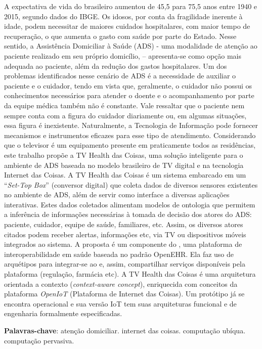 \setlength{\absparsep}{18pt} %
\begin{resumo}

A expectativa de vida do brasileiro aumentou de 45,5 para 75,5 anos entre 1940 e
2015, segundo dados do IBGE. Os idosos, por conta da fragilidade inerente à
idade, podem necessitar de maiores cuidados hospitalares, com maior tempo de
recuperação, o que aumenta o gasto com saúde por parte do Estado. Nesse sentido,
a Assistência Domiciliar à Saúde (ADS) - uma modalidade de atenção ao paciente
realizado em seu próprio domicílio, – apresenta-se como opção mais adequada ao
paciente, além da redução dos gastos hospitalares. Um dos problemas
identificados nesse cenário de ADS é a necessidade de auxiliar o paciente e o
cuidador, tendo em vista que, geralmente, o cuidador não possui os conhecimentos
necessários para atender o doente e o acompanhamento por parte da equipe médica
também não é  constante. Vale ressaltar que o paciente nem sempre conta com a
figura do cuidador diariamente ou, em algumas situações, essa figura é
inexistente. Naturalmente, a Tecnologia de Informação pode fornecer mecanismos e
instrumentos eficazes para esse tipo de atendimento. Considerando que o
televisor é um equipamento presente em praticamente todos as residências, este
trabalho propõe a TV Health das Coisas, uma solução inteligente para o
ambiente de ADS baseada no modelo brasileiro de TV digital e na tecnologia
Internet das Coisas. A TV Health das Coisas é um sistema embarcado em um ``\textit{Set-Top
Box}'' (conversor digital) que coleta dados de diversos sensores existentes no
ambiente de ADS, além de servir como interface a diversas aplicações
interativas. Estes dados coletados alimentam modelos de ontologia que permitem a
inferência de informações necessárias à tomada de decisão dos atores do ADS:
paciente, cuidador, equipe de saúde, familiares, etc. Assim, os diversos atores
citados podem receber alertas, informações etc, via TV ou dispositivos móveis
integrados ao sistema. A proposta é um componente do \nextsaude[], uma plataforma de
interoperabilidade em saúde baseada no padrão OpenEHR. Ela faz uso de arquétipos
para integrar-se ao \nextsaude[] e, assim, compartilhar serviços disponíveis pela
plataforma (regulação, farmácia etc). A TV Health das Coisas é uma arquitetura
orientada a contexto (\textit{context-aware concept}), enriquecida com
conceitos da plataforma \textit{OpenIoT} (Plataforma de Internet das Coisas).
Um protótipo já se encontra operacional e sua versão IoT tem suas arquiteturas
funcional e de engenharia formalmente especificadas.

 \textbf{Palavras-chave}: atenção domiciliar. internet das coisas. computação ubíqua. computação pervasiva.
 \end{resumo}
